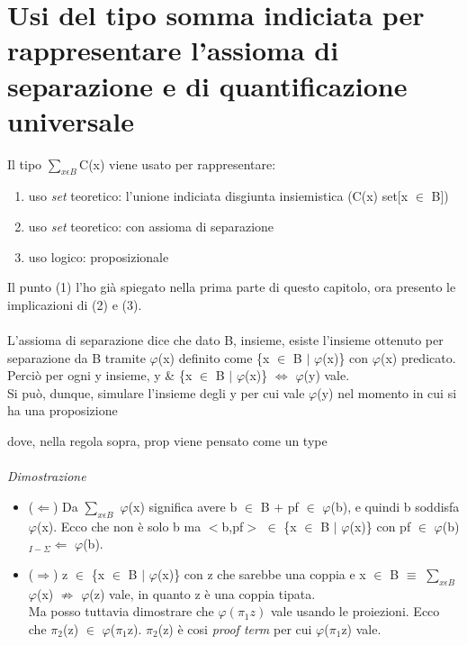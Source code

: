 \section{Usi del tipo somma indiciata per rappresentare l'assioma di separazione e di quantificazione universale}
\label{sec:usi-del-tipo-somma-indiciata}
Il tipo $\sum\limits_{x \epsilon B}$C(x) viene usato per rappresentare:
\begin{enumerate}
\item uso \textit{set} teoretico: l'unione indiciata disgiunta insiemistica (C(x) set[x $\in$ B])
\item uso \textit{set} teoretico: con assioma di separazione
\item uso logico: proposizionale
\end{enumerate}
\noindent
Il punto (1) l'ho gi\`a spiegato nella prima parte di questo capitolo, ora presento le implicazioni di (2) e (3).\\\\
\noindent
L'assioma di separazione dice che dato B, insieme, esiste l'insieme ottenuto per separazione da B tramite $\varphi$(x) definito come  \{x $\in$ B $|$ $\varphi$(x)\} con $\varphi$(x) predicato.\\
Perci\`o per ogni y insieme, y \& \{x $\in$ B $|$ $\varphi$(x)\} $\Leftrightarrow$ $\varphi$(y) vale.\\
Si pu\`o, dunque, simulare l'insieme degli y per cui vale $\varphi$(y) nel momento in cui si ha una proposizione 
\begin{prooftree}
\end{prooftree}
\noindent
dove, nella regola sopra, prop viene pensato come un type\\\\
\noindent
\textit{Dimostrazione}
\begin{itemize}
\item ($\Leftarrow$) Da $\sum\limits_{x \epsilon B}$ $\varphi$(x) significa avere b $\in$ B $+$ pf $\in$ $\varphi$(b), e quindi b soddisfa $\varphi$(x). Ecco che non \`e solo b ma $<$b,pf$>$ $\in$ \{x $\in$ B $|$ $\varphi$(x)\} con pf $\in$ $\varphi$(b) $_{I-\Sigma}\Leftarrow$ $\varphi$(b).\\
\item ($\Rightarrow$) z $\in$ \{x $\in$ B $|$ $\varphi$(x)\} con z che sarebbe una coppia e x $\in$ B $\equiv$ $\sum\limits_{x \epsilon B}$ $\varphi$(x) $\nRightarrow$ $\varphi$(z) vale, in quanto z \`e una coppia tipata.\\ 
Ma posso tuttavia dimostrare che $\varphi(\pi_1z)$ vale usando le proiezioni. Ecco che $\pi_2$(z) $\in$ $\varphi$($\pi_1$z). $\pi_2$(z) \`e cosi \textit{proof term} per cui $\varphi$($\pi_1$z) vale.
\end{itemize}

